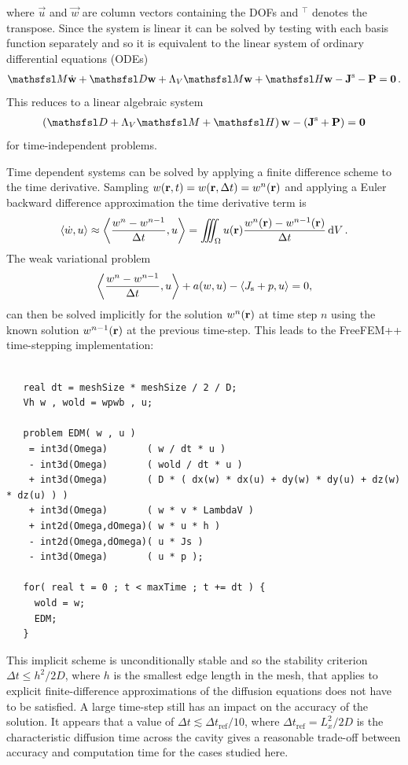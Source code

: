\documentclass[a4paper]{article}
\numberwithin{equation}{section}
\begin{document}
where $\vec{u}$ and $\vec{w}$ are column vectors containing the DOFs and ${}^\intercal$ denotes the transpose. 
Since the system is linear it can be solved by testing with each basis function separately and so it is
equivalent to the linear system of ordinary differential equations (ODEs)
\begin{align}
\mM \dot{\vec{w}} + \mD \vec{w} +\Lambda_V \mM \vec{w}+ \mH \vec{w}
-\vec{J}^\rs -\vec{P} = \vzero\,.
\end{align}
This reduces to a linear algebraic system 
\begin{align}
\left( \mD +\Lambda_V \mM + \mH \right) \vec{w} - \left( \vec{J}^\rs + \vec{P} \right) = \vzero
\end{align}
for time-independent problems. 

Time dependent systems can be solved by applying a finite difference
scheme to the time derivative. Sampling $w(\boldsymbol{\mathrm{r}},t)=w(\boldsymbol{\mathrm{r}},\Delta t)=w^n(\boldsymbol{\mathrm{r}})$
and applying a Euler backward difference approximation the time
derivative term is
\begin{align}
\langle \dot{w},u \rangle \approx
\left\langle \frac{w^n-w^{n-1}}{\Delta t},u \right\rangle
=\iiint_{\Omega} u(\boldsymbol{\mathrm{r}})  \frac{w^n(\boldsymbol{\mathrm{r}})-w^{n-1}(\boldsymbol{\mathrm{r}})}{\Delta t} \,\mathrm{d}{V}\,.
\end{align}
The weak variational problem
\begin{align}
\left\langle \frac{w^n-w^{n-1}}{\Delta t},u \right\rangle
+ a(w,u) - \langle J_{\mathrm{s}}+p ,u \rangle = 0,
\end{align}
can then be solved implicitly for the solution $w^n(\boldsymbol{\mathrm{r}})$ at time step $n$
using the known solution $w^{n-1}(\boldsymbol{\mathrm{r}})$ at the previous time-step. This 
leads to the FreeFEM++ time-stepping implementation:
\begin{verbatim}

   real dt = meshSize * meshSize / 2 / D;
   Vh w , wold = wpwb , u;

   problem EDM( w , u ) 
    = int3d(Omega)       ( w / dt * u )
    - int3d(Omega)       ( wold / dt * u )
    + int3d(Omega)       ( D * ( dx(w) * dx(u) + dy(w) * dy(u) + dz(w) * dz(u) ) )
    + int3d(Omega)       ( w * v * LambdaV )
    + int2d(Omega,dOmega)( w * u * h )   
    - int2d(Omega,dOmega)( u * Js )
    - int3d(Omega)       ( u * p );
    
   for( real t = 0 ; t < maxTime ; t += dt ) {
     wold = w;
     EDM;
   }

\end{verbatim}
This implicit scheme is unconditionally stable and so the stability criterion 
$\Delta t \leq h^2/2D$, where $h$ is the smallest edge length in the mesh, 
that applies to explicit finite-difference approximations of
the diffusion equations does not have to be satisfied. A large time-step still
has an impact on the accuracy of the solution. It appears that a value of
$\Delta t \lesssim {\Delta t}_\mathrm{ref} / 10$, where ${\Delta t}_\mathrm{ref}=L_x^2/2D$
is the characteristic diffusion time across the cavity gives a reasonable trade-off between accuracy
and computation time for the cases studied here.
\end{document}
